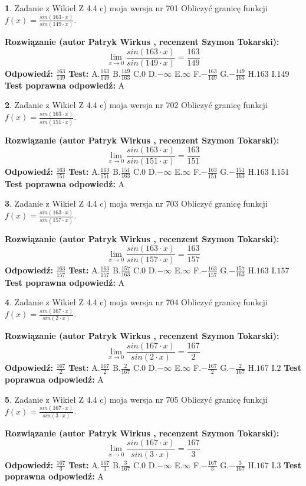\documentclass[12pt, a4paper]{article}
\theoremstyle{definition} %
\newtheorem{zad}{}
\newcommand{\zadStart}[1]{\begin{zad}#1\newline}
\newcommand{\zadStop}{\end{zad}}
\newcommand{\rozwStart}[2]{\noindent \textbf{Rozwiązanie (autor #1 , recenzent #2): }\newline}
\newcommand{\rozwStop}{\newline}
\newcommand{\odpStart}{\noindent \textbf{Odpowiedź:}\newline}
\newcommand{\odpStop}{\newline}
\newcommand{\testStart}{\noindent \textbf{Test:}\newline}
\newcommand{\testStop}{\newline}
\newcommand{\kluczStart}{\noindent \textbf{Test poprawna odpowiedź:}\newline}
\newcommand{\kluczStop}{\newline}
\begin{document}
\zadStart{Zadanie z Wikieł Z 4.4 c) moja wersja nr 701}
Obliczyć granicę funkcji $f(x)=\frac{sin(163\cdot x)}{sin(149\cdot x)}$.
\zadStop
\rozwStart{Patryk Wirkus}{Szymon Tokarski}
$$\lim\limits_{x\to 0}\frac{sin(163\cdot x)}{sin(149\cdot x)}=
\frac{163}{149}$$
\rozwStop
\odpStart
$\frac{163}{149}$
\odpStop
\testStart
A.$\frac{163}{149}$
B.$\frac{149}{163}$
C.$0$
D.$-\infty$
E.$\infty$
F.$-\frac{163}{149}$
G.$-\frac{149}{163}$
H.$163$
I.$149$
\testStop
\kluczStart
A
\kluczStop



\zadStart{Zadanie z Wikieł Z 4.4 c) moja wersja nr 702}
Obliczyć granicę funkcji $f(x)=\frac{sin(163\cdot x)}{sin(151\cdot x)}$.
\zadStop
\rozwStart{Patryk Wirkus}{Szymon Tokarski}
$$\lim\limits_{x\to 0}\frac{sin(163\cdot x)}{sin(151\cdot x)}=
\frac{163}{151}$$
\rozwStop
\odpStart
$\frac{163}{151}$
\odpStop
\testStart
A.$\frac{163}{151}$
B.$\frac{151}{163}$
C.$0$
D.$-\infty$
E.$\infty$
F.$-\frac{163}{151}$
G.$-\frac{151}{163}$
H.$163$
I.$151$
\testStop
\kluczStart
A
\kluczStop



\zadStart{Zadanie z Wikieł Z 4.4 c) moja wersja nr 703}
Obliczyć granicę funkcji $f(x)=\frac{sin(163\cdot x)}{sin(157\cdot x)}$.
\zadStop
\rozwStart{Patryk Wirkus}{Szymon Tokarski}
$$\lim\limits_{x\to 0}\frac{sin(163\cdot x)}{sin(157\cdot x)}=
\frac{163}{157}$$
\rozwStop
\odpStart
$\frac{163}{157}$
\odpStop
\testStart
A.$\frac{163}{157}$
B.$\frac{157}{163}$
C.$0$
D.$-\infty$
E.$\infty$
F.$-\frac{163}{157}$
G.$-\frac{157}{163}$
H.$163$
I.$157$
\testStop
\kluczStart
A
\kluczStop



\zadStart{Zadanie z Wikieł Z 4.4 c) moja wersja nr 704}
Obliczyć granicę funkcji $f(x)=\frac{sin(167\cdot x)}{sin(2\cdot x)}$.
\zadStop
\rozwStart{Patryk Wirkus}{Szymon Tokarski}
$$\lim\limits_{x\to 0}\frac{sin(167\cdot x)}{sin(2\cdot x)}=
\frac{167}{2}$$
\rozwStop
\odpStart
$\frac{167}{2}$
\odpStop
\testStart
A.$\frac{167}{2}$
B.$\frac{2}{167}$
C.$0$
D.$-\infty$
E.$\infty$
F.$-\frac{167}{2}$
G.$-\frac{2}{167}$
H.$167$
I.$2$
\testStop
\kluczStart
A
\kluczStop



\zadStart{Zadanie z Wikieł Z 4.4 c) moja wersja nr 705}
Obliczyć granicę funkcji $f(x)=\frac{sin(167\cdot x)}{sin(3\cdot x)}$.
\zadStop
\rozwStart{Patryk Wirkus}{Szymon Tokarski}
$$\lim\limits_{x\to 0}\frac{sin(167\cdot x)}{sin(3\cdot x)}=
\frac{167}{3}$$
\rozwStop
\odpStart
$\frac{167}{3}$
\odpStop
\testStart
A.$\frac{167}{3}$
B.$\frac{3}{167}$
C.$0$
D.$-\infty$
E.$\infty$
F.$-\frac{167}{3}$
G.$-\frac{3}{167}$
H.$167$
I.$3$
\testStop
\kluczStart
A
\kluczStop
\end{document}
